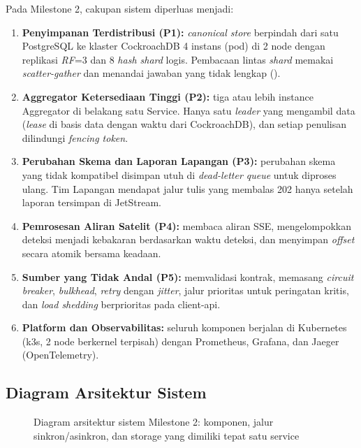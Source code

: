 Pada Milestone 2, cakupan sistem diperluas menjadi:
\begin{enumerate}[label=\alph*.]
\item \textbf{Penyimpanan Terdistribusi (P1):} \textit{canonical store} berpindah dari satu PostgreSQL ke klaster CockroachDB 4 instans (pod) di 2 node dengan replikasi \textit{RF}=3 dan 8 \textit{hash shard} logis. Pembacaan lintas \textit{shard} memakai \textit{scatter-gather} dan menandai jawaban yang tidak lengkap ().
\item \textbf{Aggregator Ketersediaan Tinggi (P2):} tiga atau lebih instance Aggregator di belakang satu Service. Hanya satu \textit{leader} yang mengambil data (\textit{lease} di basis data dengan waktu dari CockroachDB), dan setiap penulisan dilindungi \textit{fencing token}.
\item \textbf{Perubahan Skema dan Laporan Lapangan (P3):} perubahan skema yang tidak kompatibel disimpan utuh di \textit{dead-letter queue} untuk diproses ulang. Tim Lapangan mendapat jalur tulis  yang membalas 202 hanya setelah laporan tersimpan di JetStream.
\item \textbf{Pemrosesan Aliran Satelit (P4):}  membaca aliran SSE, mengelompokkan deteksi menjadi kebakaran berdasarkan waktu deteksi, dan menyimpan \textit{offset} secara atomik bersama keadaan.
\item \textbf{Sumber yang Tidak Andal (P5):}  memvalidasi kontrak, memasang \textit{circuit breaker}, \textit{bulkhead}, \textit{retry} dengan \textit{jitter}, jalur prioritas untuk peringatan kritis, dan \textit{load shedding} berprioritas pada client-api.
\item \textbf{Platform dan Observabilitas:} seluruh komponen berjalan di Kubernetes (k3s, 2 node berkernel terpisah) dengan Prometheus, Grafana, dan Jaeger (OpenTelemetry).
\end{enumerate}

\subsection{Diagram Arsitektur Sistem}

\begin{figure}[H]
\centering
\resizebox{\textwidth}{!}{}
\caption{Diagram arsitektur sistem Milestone 2: komponen, jalur sinkron/asinkron, dan storage yang dimiliki tepat satu service}
\end{figure}

